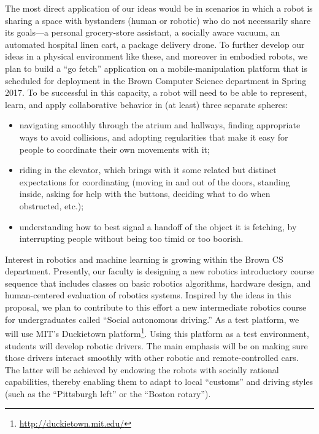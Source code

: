 The most direct application of our ideas would be in scenarios in
which a robot is sharing a space with bystanders (human or robotic)
who do not necessarily share its goals---a personal grocery-store
assistant, a socially aware vacuum, an automated hospital linen cart,
a package delivery drone.  To further develop our ideas in a physical
environment like these, and moreover in embodied robots,
we plan to build a ``go fetch'' application on a mobile-manipulation
platform that is scheduled for deployment in the Brown Computer
Science department in Spring 2017.  To be successful in this capacity,
a robot will need to be able to represent, learn, and apply
collaborative behavior in (at least) three separate spheres:

\begin{itemize}
\item navigating smoothly through the atrium and hallways, finding
  appropriate ways to avoid collisions, and adopting regularities that
  make it easy for people to coordinate their own movements with it;

\item riding in the elevator, which brings with it some related but
  distinct expectations for coordinating (moving in and out of the
  doors, standing inside, asking for help with the buttons, deciding
  what to do when obstructed, etc.);

\item understanding how to best signal a handoff of the object it is
  fetching, by interrupting people without being too timid or too
  boorish.
\end{itemize}


Interest in robotics and machine learning is growing within the Brown
CS department.  Presently, our faculty is designing a new robotics
introductory course sequence that includes classes on basic robotics
algorithms, hardware design, and human-centered evaluation of robotics
systems.  Inspired by the ideas in this proposal, we plan to
contribute to this effort a new intermediate robotics course for
undergraduates called ``Social autonomous driving.''  As a test
platform, we will use MIT's Duckietown
platform\footnote{\url{http://duckietown.mit.edu/}}.  Using this platform as a test environment, students will
develop robotic drivers.  The main emphasis will be on making sure
those drivers interact smoothly with other robotic and
remote-controlled cars.  The latter will be achieved by endowing the
robots with socially rational capabilities, thereby enabling them to
adapt to local ``customs'' and driving styles (such as the
``Pittsburgh left'' or the ``Boston rotary'').

